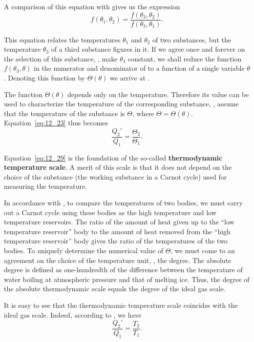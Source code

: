 \noindent
A comparison of this equation with  gives us the expression
\begin{equation}\label{eq:12_28}
	f(\theta_1,\theta_2) = \frac{f(\theta_3,\theta_2)}{f(\theta_3,\theta_1)}.
\end{equation}

\noindent
This equation relates the temperatures $\theta_1$ and $\theta_2$ of two substances, but the temperature $\theta_3$ of a third substance figures in it. If we agree once and forever on the selection of this substance, \ie, make $\theta_3$ constant, we shall reduce the function $f(\theta_3,\theta)$ in the numerator and denominator of  to a function of a single variable $\theta$. Denoting this function by $\Theta(\theta)$ we arrive at .

The function $\Theta(\theta)$ depends only on the temperature. Therefore its value can be used to characterize the temperature of the corresponding substance, \ie, assume that the temperature of the substance is $\Theta$, where $\Theta=\Theta(\theta)$. Equation~\eqref{eq:12_23} thus becomes
\begin{equation}\label{eq:12_29}
	\frac{Q_2'}{Q_1} = \frac{\Theta_2}{\Theta_1}.
\end{equation}

\noindent
Equation~\eqref{eq:12_29} is the foundation of the so-called \textbf{thermodynamic temperature scale}. A merit of this scale is that it does not depend on the choice of the substance (the working substance in a Carnot cycle) used for measuring the temperature.

In accordance with , to compare the temperatures of two bodies, we must carry out a Carnot cycle using these bodies as the high temperature and low temperature reservoirs. The ratio of the amount of heat given up to the ``low temperature reservoir'' body to the amount of heat removed from the ``high temperature reservoir'' body gives the ratio of the temperatures of the two bodies. To uniquely determine the numerical value of $\Theta$, we must come to an agreement on the choice of the temperature unit, \ie, the degree. The absolute degree is defined as one-hundredth of the difference between the temperature of water boiling at atmospheric pressure and that of melting ice. Thus, the degree of the absolute thermodynamic scale equals the degree of the ideal gas scale.

It is easy to see that the thermodynamic temperature scale coincides with the ideal gas scale. Indeed, according to , we have
\begin{equation}\label{eq:12_30}
	\frac{Q_2'}{Q_1} = \frac{T_2}{T_1}.
\end{equation}

